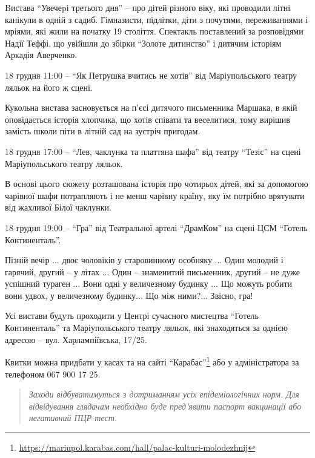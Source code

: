 Bистава \enquote{Увечеpі третього дня} – про дітей різного віку, які проводили
літні канікули в одній з садиб. Гімназисти, підлітки, діти з почутями,
переживаннями і мріями, які жили на початку 19 століття. Спектакль поставлений
за розповідями Надії Теффі, що увійшли до збірки \enquote{Золоте дитинство} і
дитячим історіям Аркадія Аверченко.


18 грудня 11:00 – \enquote{Як Петрушка вчитись не хотів} від Маріупольського театру ляльок на його ж сцені.

Кукольна вистава засновується на п'єсі дитячого письменника Маршака, в якій
оповідається історія хлопчика, що хотів співати та веселитися, тому вирішив
замість школи піти в літній сад на зустріч пригодам.


18 грудня 17:00 – \enquote{Лев, чаклунка та платтяна шафа} від театру
\enquote{Тезіс} на сцені Маріупольського театру ляльок.

В основі цього сюжету розташована історія про чотирьох дітей, які за допомогою
чарівної шафи потрапляють і не менш чарівну країну, яку їм потрібно врятувати
від жахливої Білої чаклунки.


18 грудня 19:00 – \enquote{Гра} від Театральної артелі \enquote{ДрамКом} на сцені ЦСМ \enquote{Готель Континенталь}.

Пізній вечір ... двоє чоловіків у старовинному особняку ... Один молодий і гарячий,
другий – у літах ... Один – знаменитий письменник, другий – не дуже успішний
тураген ... Вони одні у величезному будинку ... Що можуть робити вони удвох, у
величезному будинку... Що між ними?... Звісно, гра!


Усі вистави будуть проходити у Центрі сучасного мистецтва \enquote{Готель
Континенталь} та Маріупольського театру ляльок, які знаходяться за однією
адресою – вул.  Харлампіївська, 17/25.

Квитки можна придбати у касах та на сайті \enquote{Карабас}\footnote{\url{https://mariupol.karabas.com/hall/palac-kulturi-molodezhnij}} або у
адміністратора за телефоном 067 900 17 25.

\begin{quote}
\em
Заходи відбуватимуться з дотриманням усіх епідеміологічних норм. Для
відвідування глядачам необхідно буде пред'явити паспорт вакцинації або
негативний ПЦР-тест.	
\end{quote}
